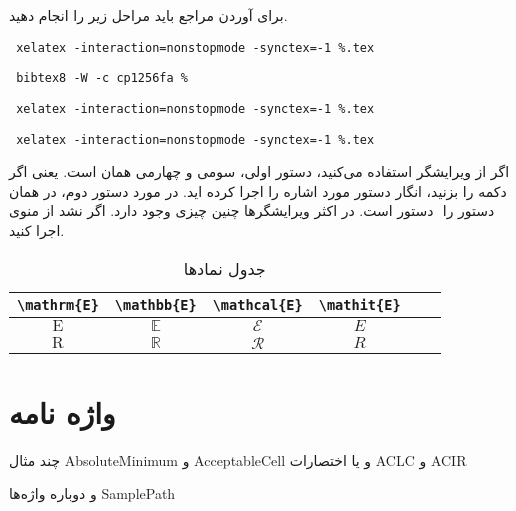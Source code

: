 \documentclass{report}
\begin{document}
برای آوردن مراجع باید مراحل زیر را انجام دهید.
\begin{itemize}
\begin{LTRitems}
\item
\verb+ xelatex -interaction=nonstopmode -synctex=-1 %.tex+
\item
\verb+ bibtex8 -W -c cp1256fa % +
\item
\verb+ xelatex -interaction=nonstopmode -synctex=-1 %.tex+
\item
\verb+ xelatex -interaction=nonstopmode -synctex=-1 %.tex+
\end{LTRitems}
\end{itemize}
اگر از ویرایشگر {} استفاده می‌کنید، دستور اولی، سومی و چهارمی همان {} است. یعنی اگر دکمه {} را بزنید، انگار دستور مورد اشاره را اجرا کرده اید. در مورد دستور دوم، در {} همان دستور {} است. در اکثر ویرایشگرها چنین چیزی وجود دارد.  اگر نشد از منوی ‎‎ دستور
را اجرا کنید. 



\begin{table}
\caption{جدول نمادها}
\label{table:asas}
\begin{tabular}{|c|c|c|c|c|c}\hline
\verb|\mathrm{E}| & \verb|\mathbb{E}|& \verb|\mathcal{E}|& \verb|\mathit{E}|\\\hline
$\mathrm{E}$ & $\mathbb{E}$ & $\mathcal{E}$ & $\mathit{E}$\\\hline
$\mathrm{R}$ & $\mathbb{R}$ & $\mathcal{R}$ & $\mathit{R}$\\\hline
\end{tabular}
\end{table}


\chapter{واژه نامه}
چند مثال 
\gls{AbsoluteMinimum} و \gls{AcceptableCell}
 و یا اختصارات
\gls{ACLC} و \gls{ACIR}

و دوباره واژه‌ها
\gls{SamplePath}


\printglossary
\printabbreviation
\end{document}
